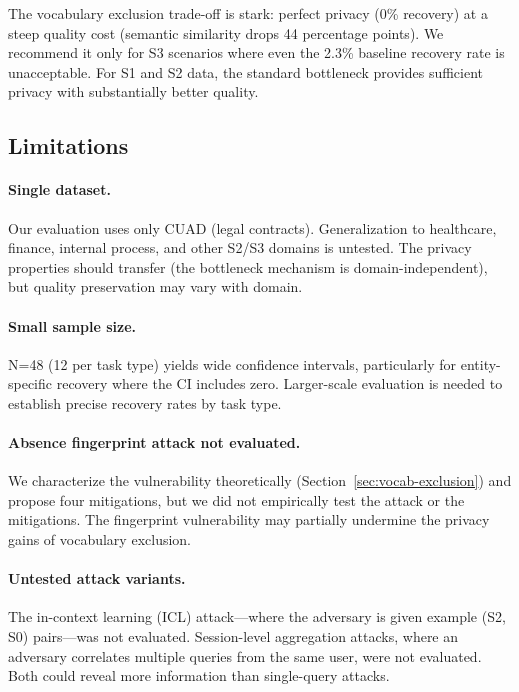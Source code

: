 \documentclass[sigconf,anonymous,review,balance=false]{acmart}
\begin{document}
The vocabulary exclusion trade-off is stark: perfect privacy (0\% recovery) at a steep quality cost (semantic similarity drops 44 percentage points). We recommend it only for S3 scenarios where even the 2.3\% baseline recovery rate is unacceptable. For S1 and S2 data, the standard bottleneck provides sufficient privacy with substantially better quality.

\subsection{Limitations}
\label{sec:limitations}

\paragraph{Single dataset.} Our evaluation uses only CUAD (legal contracts). Generalization to healthcare, finance, internal process, and other S2/S3 domains is untested. The privacy properties should transfer (the bottleneck mechanism is domain-independent), but quality preservation may vary with domain.

\paragraph{Small sample size.} N=48 (12 per task type) yields wide confidence intervals, particularly for entity-specific recovery where the CI includes zero. Larger-scale evaluation is needed to establish precise recovery rates by task type.

\paragraph{Absence fingerprint attack not evaluated.} We characterize the vulnerability theoretically (Section~\ref{sec:vocab-exclusion}) and propose four mitigations, but we did not empirically test the attack or the mitigations. The fingerprint vulnerability may partially undermine the privacy gains of vocabulary exclusion.

\paragraph{Untested attack variants.} The in-context learning (ICL) attack---where the adversary is given example (S2, S0) pairs---was not evaluated. Session-level aggregation attacks, where an adversary correlates multiple queries from the same user, were not evaluated. Both could reveal more information than single-query attacks.
\end{document}
